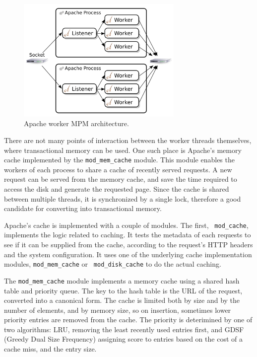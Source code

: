 \documentclass[preprint,11pt]{sigplanconf}
\begin{document}
\begin{figure}
 \begin{center}
  \includegraphics[width=8cm]{Apache-Worker-MPM.png}
 \end{center}
 \caption{Apache worker MPM architecture.}
 \label{fig:apache-worker-MPM}
\end{figure}

There are not many points of interaction between the worker threads themselves,
where transactional memory can be used. One such place is Apache's memory cache
implemented by the {\tt mod\_mem\_cache} module. This module enables the workers
of each process to share a cache of recently served requests. A new request can
be served from the memory cache, and save the time required to access the disk
and generate the requested page. Since the cache is shared between multiple
threads, it is synchronized by a single lock, therefore a good candidate for
converting into transactional memory.

Apache's cache is implemented with a couple of modules. The first, {\tt
mod\_cache}, implements the logic related to caching. It tests the metadata of
each requests to see if it can be supplied from the cache, according to the
request's HTTP headers and the system configuration. It uses one of the
underlying cache implementation modules, {\tt mod\_mem\_cache} or {\tt
mod\_disk\_cache} to do the actual caching.

The {\tt mod\_mem\_cache} module implements a memory cache using a shared hash
table and priority queue. The key to the hash table is the URL of the request,
converted into a canonical form. The cache is limited both by size and by the
number of elements, and by memory size, so on insertion, sometimes lower
priority entries are removed from the cache. The priority is deterimined by one
of two algorithms: LRU, removing the least recently used entries first, and GDSF
(Greedy Dual Size Frequency) assigning score to entries based on the cost of a
cache miss, and the entry size.
\end{document}
